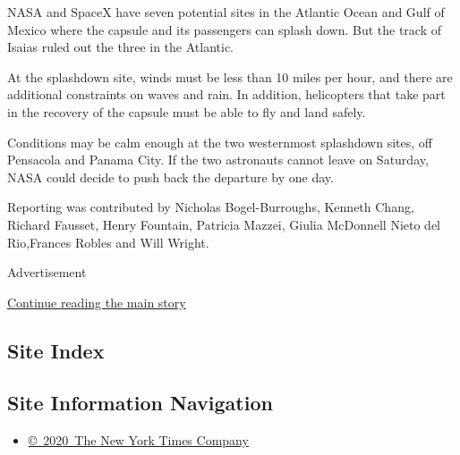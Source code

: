 NASA and SpaceX have seven potential sites in the Atlantic Ocean and
Gulf of Mexico where the capsule and its passengers can splash down. But
the track of Isaias ruled out the three in the Atlantic.

At the splashdown site, winds must be less than 10 miles per hour, and
there are additional constraints on waves and rain. In addition,
helicopters that take part in the recovery of the capsule must be able
to fly and land safely.

Conditions may be calm enough at the two westernmost splashdown sites,
off Pensacola and Panama City. If the two astronauts cannot leave on
Saturday, NASA could decide to push back the departure by one day.

Reporting was contributed by Nicholas Bogel-Burroughs, Kenneth Chang,
Richard Fausset, Henry Fountain, Patricia Mazzei, Giulia McDonnell Nieto
del Rio,Frances Robles and Will Wright.

Advertisement

\protect\hyperlink{after-bottom}{Continue reading the main story}

\hypertarget{site-index}{%
\subsection{Site Index}\label{site-index}}

\hypertarget{site-information-navigation}{%
\subsection{Site Information
Navigation}\label{site-information-navigation}}

\begin{itemize}
\tightlist
\item
  \href{https://help.nytimes3xbfgragh.onion/hc/en-us/articles/115014792127-Copyright-notice}{©~2020~The
  New York Times Company}
\end{itemize}

